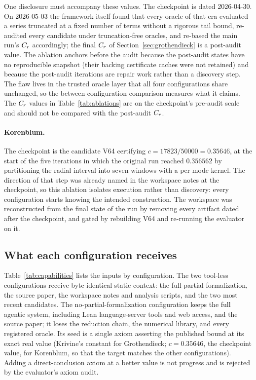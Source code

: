 One disclosure must accompany these values. The checkpoint is dated
2026-04-30. On 2026-05-03 the framework itself found that every oracle of that
era evaluated a series truncated at a fixed number of terms without a rigorous
tail bound, re-audited every candidate under truncation-free oracles, and
re-based the main run's $C_r$ accordingly; the final $C_r$ of
Section~\ref{sec:grothendieck} is a post-audit value. The ablation anchors
before the audit because the post-audit states have no reproducible snapshot
(their backing certificate caches were not retained) and because the
post-audit iterations are repair work rather than a discovery step. The flaw
lives in the trusted oracle layer that all four configurations share
unchanged, so the between-configuration comparison measures what it claims.
The $C_r$ values in Table~\ref{tab:ablations} are on the checkpoint's
pre-audit scale and should not be compared with the post-audit $C_r$.

\paragraph{Korenblum.}
The checkpoint is the candidate V64 certifying $c = 17823/50000 = 0.35646$, at
the start of the five iterations in which the original run reached
$0.356562$ by partitioning the radial interval into seven windows with a
per-mode kernel. The direction of that step was already named in the workspace
notes at the checkpoint, so this ablation isolates execution rather than
discovery: every configuration starts knowing the intended construction. The
workspace was reconstructed from the final state of the run by removing every
artifact dated after the checkpoint, and gated by rebuilding V64 and re-running
the evaluator on it.

\subsection{What each configuration receives}

Table~\ref{tab:capabilities} lists the inputs by configuration. The two
tool-less configurations receive byte-identical static context: the full partial
formalization, the source paper, the workspace notes and analysis scripts, and
the two most recent candidates. The no-partial-formalization configuration keeps
the full agentic system, including Lean language-server tools and web access,
and the source paper; it loses the reduction chain, the numerical library, and
every registered oracle. Its seed is a single axiom asserting the published bound
at its exact real value (Krivine's constant for Grothendieck; $c = 0.35646$,
the checkpoint value, for Korenblum, so that the target matches the other
configurations). Adding a direct-conclusion axiom at a better value is not
progress and is rejected by the evaluator's axiom audit.

